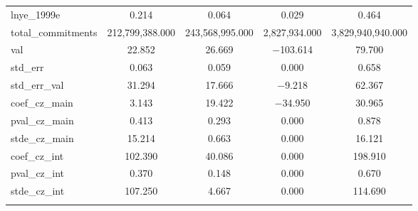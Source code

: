 \documentclass{article}\usepackage[]{graphicx}\usepackage[]{color}
\newenvironment{knitrout}{}{}  %
\begin{document}
\begin{knitrout}
\begin{table}[!htbp]
\begin{tabular}{@{\extracolsep{5pt}}lcccc}
lnye\_1999e & 0.214 & 0.064 & 0.029 & 0.464 \\ 
total\_commitments & 212,799,388.000 & 243,568,995.000 & 2,827,934.000 & 3,829,940,940.000 \\ 
val & 22.852 & 26.669 & $-$103.614 & 79.700 \\ 
std\_err & 0.063 & 0.059 & 0.000 & 0.658 \\ 
std\_err\_val & 31.294 & 17.666 & $-$9.218 & 62.367 \\ 
coef\_cz\_main & 3.143 & 19.422 & $-$34.950 & 30.965 \\ 
pval\_cz\_main & 0.413 & 0.293 & 0.000 & 0.878 \\ 
stde\_cz\_main & 15.214 & 0.663 & 0.000 & 16.121 \\ 
coef\_cz\_int & 102.390 & 40.086 & 0.000 & 198.910 \\ 
pval\_cz\_int & 0.370 & 0.148 & 0.000 & 0.670 \\ 
stde\_cz\_int & 107.250 & 4.667 & 0.000 & 114.690 \\ 
\hline \\[-1.8ex] 
\end{tabular} 
\end{table} 



\end{knitrout}
\end{document}
